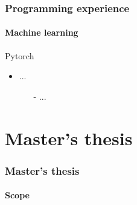 \documentclass[
	10pt, %
]{beamer}
\begin{document}
\begin{frame}
	\frametitle{Programming experience}
	\framesubtitle{Machine learning}

	{\large Pytorch} 
	\begin{itemize}
		\item ...
		\begin{itemize}
			\item [-] ...
		\end{itemize}
	
	\end{itemize}


\end{frame}





\section{Master's thesis}


\begin{frame}
	\frametitle{Master's thesis}
	\framesubtitle{Scope}



\end{frame}
\end{document}
